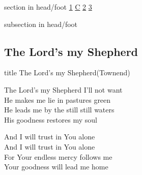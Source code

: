 \documentclass{beamer}
\begin{document}
{
{ 
 {
 \begin{beamercolorbox}[ht=4.5ex,dp=1.5ex,%
      leftskip=.3cm,rightskip=.3cm plus1fil]{section in head/foot}
 \fontsize{12}{25}\selectfont 
\hyperlink{The Lord's my Shepherd['Psalm 23'](Townend)1}{1}
\hyperlink{The Lord's my Shepherd['Psalm 23'](Townend)C}{C}
\hyperlink{The Lord's my Shepherd['Psalm 23'](Townend)2}{2}
\hyperlink{The Lord's my Shepherd['Psalm 23'](Townend)3}{3}
 
 \end{beamercolorbox}%
  \begin{beamercolorbox}[ht=2.5ex,dp=1.125ex,%
   leftskip=.3cm,rightskip=.3cm plus1fil]{subsection in head/foot}
   \insertauthor
 \end{beamercolorbox}%
 }
}
\subsection{ The Lord's my Shepherd }

\hypertarget{The Lord's my Shepherd['Psalm 23'](Townend)}{}
\begin{frame}{}
 \vfill
  \centering
  \begin{beamercolorbox}[sep=8pt,center,shadow=true,rounded=true]{title}
    The Lord's my Shepherd(Townend)    
  \end{beamercolorbox}
  \vfill
\end{frame}

\hypertarget{The Lord's my Shepherd['Psalm 23'](Townend)1}{}
\begin{frame}{}
\fontsize{ 20 }{ 27 }\selectfont

The Lord's my Shepherd I'll not want\\ 
He makes me lie in pastures green\\ 
He leads me by the still still waters\\ 
His goodness restores my soul 

\end{frame}

\hypertarget{The Lord's my Shepherd['Psalm 23'](Townend)C}{}
\begin{frame}{}
\fontsize{ 20 }{ 27 }\selectfont

And I will trust in You alone\\ 
And I will trust in You alone\\ 
For Your endless mercy follows me\\ 
Your goodness will lead me home 


\end{frame}}
\end{document}
